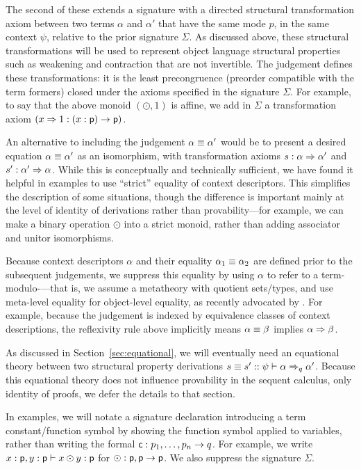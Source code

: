 The second of these extends a signature with a directed structural
transformation axiom between two terms $\alpha$ and $\alpha'$ that have
the same mode $p$, in the same context $\psi$, relative to the prior
signature $\Sigma$.  As discussed above, these structural
transformations will be used to represent object language structural
properties such as weakening and contraction that are not invertible.
The judgement  defines these
transformations: it is the least precongruence (preorder compatible with
the term formers) closed under the axioms specified in the signature
$\Sigma$.  For example, to say that the above monoid $(\odot,1)$ is
affine, we add in $\Sigma$ a transformation axiom $(x \spr 1 : (x:\dsd{p}) \to
{\dsd{p}})$.
{An alternative to including the judgement $\alpha \deq \alpha'$ would be
to present a desired equation $\alpha \deq \alpha'$ as an isomorphism,
with transformation axioms $s : \alpha \spr \alpha'$ and $s' : \alpha'
\spr \alpha$.  While this is conceptually and technically sufficient, we
have found it helpful in examples to use ``strict'' equality of context
descriptors.  This simplifies the description of some situations, though
the difference is important mainly at the level of identity of
derivations rather than provability---for example, we can make a binary
operation $\odot$ into a strict monoid, rather than adding associator
and unitor isomorphisms.

}
Because context descriptors
$\alpha$ and their equality $\alpha_1 \deq \alpha_2$ are defined prior
to the subsequent judgements, we suppress this equality by using
$\alpha$ to refer to a term-modulo-\deq---that is, we assume a
metatheory with quotient sets/types, and use meta-level equality for
object-level equality, as recently advocated by
\citet{altenkirchkaposi16qit}.  For example, because the judgement
 is indexed by equivalence classes of
context descriptions, the reflexivity rule above implicitly means
$\alpha \deq \beta$ implies $\alpha \spr \beta$.
{
As discussed in Section~\ref{sec:equational}, we will eventually need an
equational theory between two structural property derivations $s \deq s'
:: \wfsp{\psi}{\alpha}{\alpha'}{q}$.  Because this equational theory
does not influence provability in the sequent calculus, only identity of
proofs, we defer the details to that section.  

}
In examples, we will notate a signature declaration introducing a term
constant/function symbol by showing the function symbol applied to
variables, rather than writing the formal $\dsd{c} : p_1,\ldots,p_n \to
q$. For example, we write $x : \dsd{p}, y : \dsd{p} \vdash x \odot y :
\dsd{p}$ for $\odot : \dsd{p},\dsd{p} \to \dsd{p}$.  We also suppress
the signature $\Sigma$.

